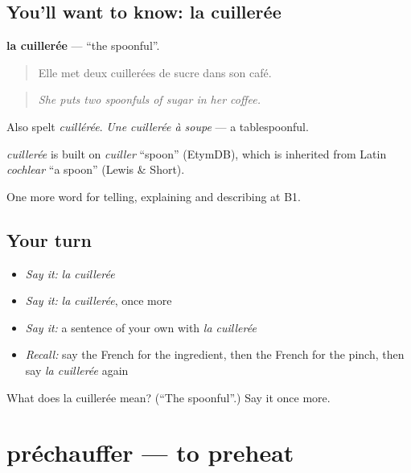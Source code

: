 \subsection*{You'll want to know: la cuillerée}
\textbf{la cuillerée} — \textquotedblleft{}the spoonful\textquotedblright{}.

\begin{quote}
Elle met deux cuillerées de sucre dans son café.
\end{quote}

\begin{quote}
\emph{She puts two spoonfuls of sugar in her coffee.}
\end{quote}

Also spelt \emph{cuillérée}. \emph{Une cuillerée à soupe} — a tablespoonful.

\begin{cousinweb}
\emph{cuillerée} is built on \emph{cuiller} \textquotedblleft{}spoon\textquotedblright{} (EtymDB), which is inherited from Latin \emph{cochlear} \textquotedblleft{}a spoon\textquotedblright{} (Lewis \& Short).
\end{cousinweb}

\begin{grammarlens}[title={What you've built}]
One more word for telling, explaining and describing at B1.
\end{grammarlens}

\subsection*{Your turn}
\begin{itemize}
\raggedright
  \item \emph{Say it:} \emph{la cuillerée}
  \item \emph{Say it:} \emph{la cuillerée}, once more
  \item \emph{Say it:} a sentence of your own with \emph{la cuillerée}
  \item \emph{Recall:} say the French for the ingredient, then the French for the pinch, then say \emph{la cuillerée} again
\end{itemize}

\begin{tcolorbox}[breakable,colback=teal!4,colframe=teal!35!black,title={Before you move on}]
What does la cuillerée mean? (\textquotedblleft{}The spoonful\textquotedblright{}.) Say it once more.
\end{tcolorbox}
\section[préchauffer]{préchauffer — to preheat}

